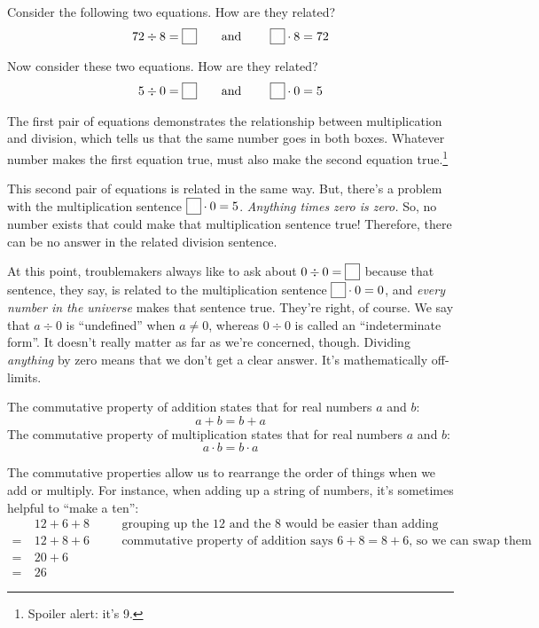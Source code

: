 \begin{boxedexplore}
Consider the following two equations. How are they related?
\[72 \div 8 = \fbox{\color{white}0} \text{\qquad and \qquad} \fbox{\color{white}0} \cdot 8 = 72\]

Now consider these two equations. How are they related?
\[5 \div 0 = \fbox{\color{white}0} \text{\qquad and \qquad} \fbox{\color{white}0} \cdot 0 = 5\]

The first pair of equations demonstrates the relationship between multiplication and division, which tells us that the same number goes in both boxes. Whatever number makes the first equation true, must also make the second equation true.\footnote{Spoiler alert: it's 9.}

This second pair of equations is related in the same way. But, there's a problem with the multiplication sentence $\fbox{\color{white}0} \cdot 0 = 5$. \textit{Anything times zero is zero.} So, no number exists that could make that multiplication sentence true! Therefore, there can be no answer in the related division sentence.

At this point, troublemakers always like to ask about $0 \div 0 = \fbox{\color{white}0}$ because that sentence, they say, is related to the multiplication sentence $\fbox{\color{white}0} \cdot 0 = 0$, and \textit{every number in the universe} makes that sentence true. They're right, of course. We say that $a \div 0$ is ``undefined'' when $a \neq 0$, whereas $0 \div 0$ is called an ``indeterminate form''. It doesn't really matter as far as we're concerned, though. Dividing \textit{anything} by zero means that we don't get a clear answer. It's mathematically off-limits.
\end{boxedexplore}

\begin{boxeddefex}
The \gls{commutative property of addition} states that for real numbers $a$ and $b$: \[a+b = b+a\]
\tcblower
The \gls{commutative property of multiplication} states that for real numbers $a$ and $b$: \[a \cdot b = b \cdot a\]
\end{boxeddefex}

The commutative properties allow us to rearrange the order of things when we add or multiply. For instance, when adding up a string of numbers, it's sometimes helpful to ``make a ten'':
\[\begin{aligned}
&12 + 6 + 8
&& \quad\text{grouping up the 12 and the 8 would be easier than adding left-to-right}
\\
=~&12 + 8 + 6
&& \quad\text{commutative property of addition says $6+8=8+6$, so we can swap them}
\\
=~&20 + 6
&&
\\
=~&26
&&
\end{aligned}\]

